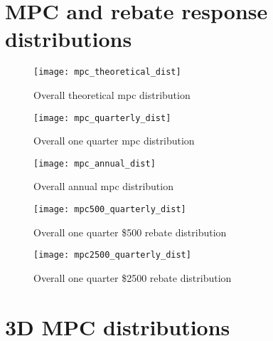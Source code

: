 \documentclass[english]{article}
\begin{document}

\newpage
\section{MPC and rebate response distributions}

\begin{multicols}{2}

\begin{figure}[H]
\protect\caption{Overall theoretical mpc distribution}
\centering{}
\texttt{[image: mpc\_theoretical\_dist]}
\end{figure}

\begin{figure}[H]
\protect\caption{Overall one quarter mpc distribution}
\centering{}
\texttt{[image: mpc\_quarterly\_dist]}
\end{figure}

\begin{figure}[H]
\protect\caption{Overall annual mpc distribution}
\centering{}
\texttt{[image: mpc\_annual\_dist]}
\end{figure}

\begin{figure}[H]
\protect\caption{Overall one quarter \$500 rebate distribution}
\centering{}
\texttt{[image: mpc500\_quarterly\_dist]}
\end{figure}

\begin{figure}[H]
\protect\caption{Overall one quarter \$2500 rebate distribution}
\centering{}
\texttt{[image: mpc2500\_quarterly\_dist]}
\end{figure}

\end{multicols}
\newpage
\section{3D MPC distributions}
\end{document}
